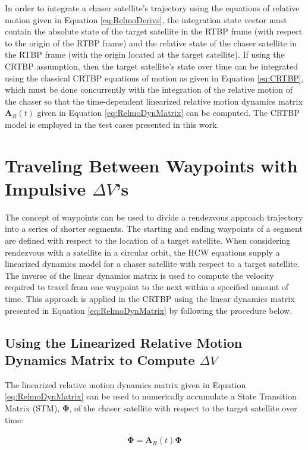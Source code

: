 \documentclass[a4paper]{article}
\begin{document}
In order to integrate a chaser satellite's trajectory using the equations of relative motion given in Equation \ref{eq:RelmoDerivs}, the integration state vector must contain the absolute state of the target satellite in the RTBP frame (with respect to the origin of the RTBP frame) and the relative state of the chaser satellite in the RTBP frame (with the origin located at the target satellite).  If using the CRTBP assumption, then the target satellite's state over time can be integrated using the classical CRTBP equations of motion as given in Equation \ref{eq:CRTBP}, which must be done concurrently with the integration of the relative motion of the chaser so that the time-dependent linearized relative motion dynamics matrix \(\mathbf{A}_R(t)\) given in Equation \ref{eq:RelmoDynMatrix} can be computed. The CRTBP model is employed in the test cases presented in this work.

\section{Traveling Between Waypoints with Impulsive \(\Delta V\)'s}
The concept of waypoints can be used to divide a rendezvous approach trajectory into a series of shorter segments.  The starting and ending waypoints of a segment are defined with respect to the location of a target satellite.  When considering rendezvous with a satellite in a circular orbit, the HCW equations supply a linearized dynamics model for a chaser satellite with respect to a target satellite.  The inverse of the linear dynamics matrix is used to compute the velocity required to travel from one waypoint to the next within a specified amount of time.  This approach is applied in the CRTBP using the linear dynamics matrix presented in Equation \ref{eq:RelmoDynMatrix} by following the procedure below. 

\subsection{Using the Linearized Relative Motion Dynamics Matrix to Compute \(\Delta V\)}

The linearized relative motion dynamics matrix given in Equation \ref{eq:RelmoDynMatrix} can be used to numerically accumulate a State Transition Matrix (STM), \(\boldsymbol{\Phi}\), of the chaser satellite with respect to the target satellite over time:

\begin{equation} \label{eq:STM}
\dot{\boldsymbol{\Phi}} = \mathbf{A}_R(t)\boldsymbol{\Phi}
\end{equation}
\end{document}
